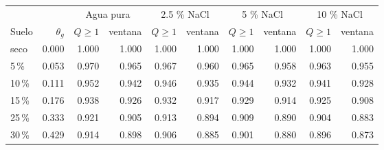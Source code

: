 \begin{tabular}{lrrrrrrrrr}
\toprule
 & & \multicolumn{2}{c}{Agua pura} & \multicolumn{2}{c}{2.5 \% NaCl} & \multicolumn{2}{c}{5 \% NaCl} & \multicolumn{2}{c}{10 \% NaCl} \\
Suelo & $\theta_g$ & $Q\geq1$ & ventana & $Q\geq1$ & ventana & $Q\geq1$ & ventana & $Q\geq1$ & ventana \\
\midrule
seco & 0.000 & 1.000 & 1.000 & 1.000 & 1.000 & 1.000 & 1.000 & 1.000 & 1.000 \\
5\,\% & 0.053 & 0.970 & 0.965 & 0.967 & 0.960 & 0.965 & 0.958 & 0.963 & 0.955 \\
10\,\% & 0.111 & 0.952 & 0.942 & 0.946 & 0.935 & 0.944 & 0.932 & 0.941 & 0.928 \\
15\,\% & 0.176 & 0.938 & 0.926 & 0.932 & 0.917 & 0.929 & 0.914 & 0.925 & 0.908 \\
25\,\% & 0.333 & 0.921 & 0.905 & 0.913 & 0.894 & 0.909 & 0.890 & 0.904 & 0.883 \\
30\,\% & 0.429 & 0.914 & 0.898 & 0.906 & 0.885 & 0.901 & 0.880 & 0.896 & 0.873 \\
\bottomrule
\end{tabular}
